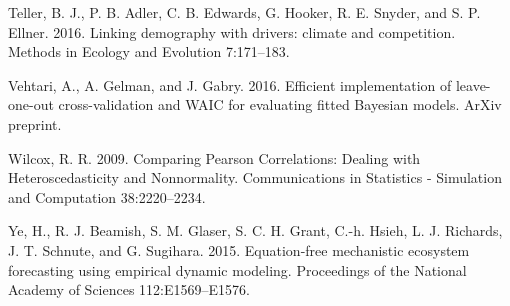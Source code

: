 \documentclass[12pt,]{article}
\begin{document}
Teller, B. J., P. B. Adler, C. B. Edwards, G. Hooker, R. E. Snyder, and
S. P. Ellner. 2016. Linking demography with drivers: climate and
competition. Methods in Ecology and Evolution 7:171--183.

Vehtari, A., A. Gelman, and J. Gabry. 2016. Efficient implementation of
leave-one-out cross-validation and WAIC for evaluating fitted Bayesian
models. ArXiv preprint.

Wilcox, R. R. 2009. Comparing Pearson Correlations: Dealing with
Heteroscedasticity and Nonnormality. Communications in Statistics -
Simulation and Computation 38:2220--2234.

Ye, H., R. J. Beamish, S. M. Glaser, S. C. H. Grant, C.-h. Hsieh, L. J.
Richards, J. T. Schnute, and G. Sugihara. 2015. Equation-free
mechanistic ecosystem forecasting using empirical dynamic modeling.
Proceedings of the National Academy of Sciences 112:E1569--E1576.
\end{document}

